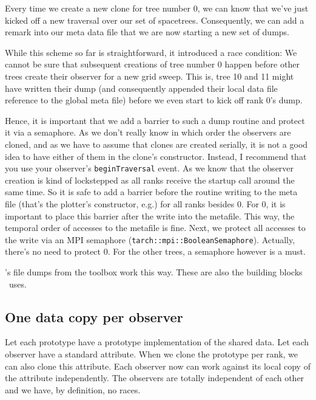 Every time we create a new clone for tree number 0, we can know that we've just
kicked off a new traversal over our set of spacetrees.
Consequently, we can add a remark into our meta data file that we are now
starting a new set of dumps.


While this scheme so far is straightforward, it introduced a race condition: 
We cannot be sure that subsequent creations of tree number 0 happen before other
trees create their observer for a new grid sweep.
This is, tree 10 and 11 might have written their dump (and consequently
appended their local data file reference to the global meta file) before we even
start to kick off rank 0's dump.


 
Hence, it is important that we add a barrier to such a dump routine and
protect it via a semaphore.
As we don't really know in which order the observers are cloned, and as we have
to assume that clones are created serially, it is not a good idea to have either
of them in the clone's constructor.
Instead, I recommend that you use your observer's
\texttt{beginTraversal} event.
As we know that the observer creation is kind of lockstepped as all ranks
receive the startup call around the same time.
So it is safe to add a barrier before the routine writing to the meta file
(that's the plotter's constructor, e.g.) for all ranks besides 0.
For 0, it is important to place this barrier after the write into the metafile.
This way, the temporal order of accesses to the metafile is fine.
Next, we protect all accesses to the write via an MPI semaphore
(\texttt{tarch::mpi::BooleanSemaphore}).
Actually, there's no need to protect 0. 
For the other trees, a semaphore however is a must.




\begin{remark}
 \Peano's file dumps from the toolbox work this way.
 These are also the building blocks \ExaHyPE\ uses.
\end{remark}


\subsection*{One data copy per observer}


Let each prototype have a prototype implementation of the shared data.
Let each observer have a standard attribute.
When we clone the prototype per rank, we can also clone this attribute.
Each observer now can work against its local copy of the attribute
independently.
The observers are totally independent of each other and we have, by definition,
no races.


